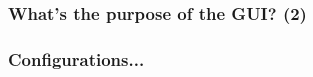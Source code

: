 \begin{frame}
 \frametitle{What's the purpose of the GUI? (2)}
 \centering
{}
\end{frame}


\begin{frame}
 \frametitle{Configurations...}
 \centering
{}
\end{frame}

